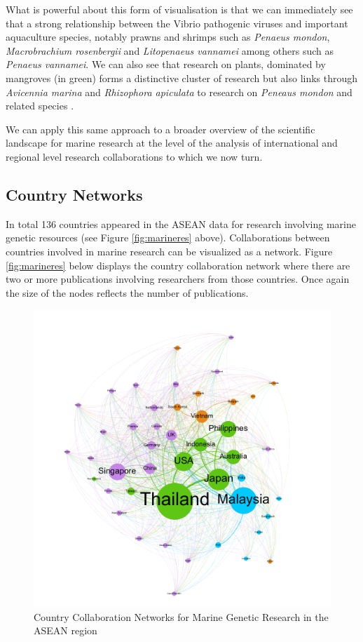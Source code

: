 \documentclass[openany]{book}
\theoremstyle{definition}
\theoremstyle{definition}
\theoremstyle{definition}
\theoremstyle{remark}
\begin{document}
What is powerful about this form of visualisation is that we can
immediately see that a strong relationship between the Vibrio pathogenic
viruses and important aquaculture species, notably prawns and shrimps
such as \emph{Penaeus mondon}, \emph{Macrobrachium rosenbergii} and
\emph{Litopenaeus vannamei} among others such as \emph{Penaeus
vannamei}. We can also see that research on plants, dominated by
mangroves (in green) forms a distinctive cluster of research but also
links through \emph{Avicennia marina} and \emph{Rhizophora apiculata} to
research on \emph{Peneaus mondon} and related species \citep{Hai_2005}.

We can apply this same approach to a broader overview of the scientific
landscape for marine research at the level of the analysis of
international and regional level research collaborations to which we now
turn.

\hypertarget{country-networks}{%
\subsection{Country Networks}\label{country-networks}}

In total 136 countries appeared in the ASEAN data for research involving
marine genetic resources (see Figure \ref{fig:marineres} above).
Collaborations between countries involved in marine research can be
visualized as a network. Figure \ref{fig:marineres} below displays the
country collaboration network where there are two or more publications
involving researchers from those countries. Once again the size of the
nodes reflects the number of publications.

\begin{figure}

{\centering \includegraphics[width=1\linewidth]{images/aseanmarinlit_country_network} 

}

\caption{Country Collaboration Networks for Marine Genetic Research in the ASEAN region}\label{fig:countrynetwork}
\end{figure}
\end{document}
